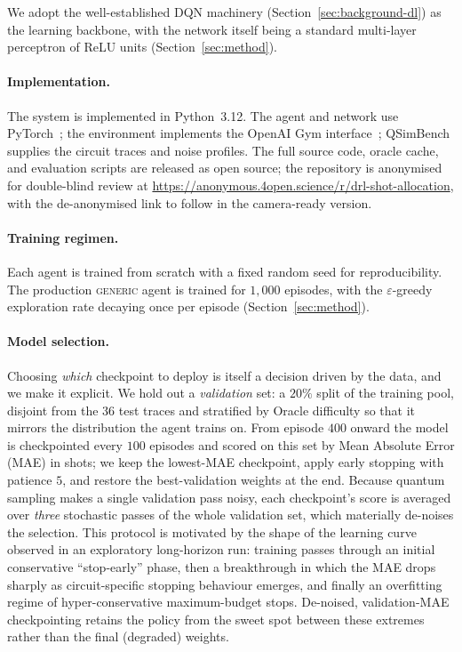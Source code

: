 \documentclass[runningheads]{llncs}
\begin{document}
We adopt the well-established DQN machinery (Section~\ref{sec:background-dl}) as
the learning backbone, with the network itself being a standard multi-layer
perceptron of ReLU units (Section~\ref{sec:method}).

\paragraph{Implementation.} The system is implemented in Python~3.12. The agent
and network use PyTorch~\cite{paszke2019pytorch}; the environment implements the
OpenAI Gym interface~\cite{brockman2016gym}; QSimBench supplies the circuit
traces and noise profiles. The full source code, oracle cache, and evaluation
scripts are released as open source; the repository is anonymised for
double-blind review at
\url{https://anonymous.4open.science/r/drl-shot-allocation}, with the
de-anonymised link to follow in the camera-ready version.

\paragraph{Training regimen.} Each agent is trained from scratch with a fixed
random seed for reproducibility. The production \textsc{generic} agent is
trained for $1{,}000$ episodes, with the $\varepsilon$-greedy exploration rate
decaying once per episode (Section~\ref{sec:method}).

\paragraph{Model selection.} Choosing \emph{which} checkpoint to deploy is itself
a decision driven by the data, and we make it explicit. We hold out a
\emph{validation} set: a $20\%$ split of the training pool, disjoint from the 36
test traces and stratified by Oracle difficulty so that it mirrors the
distribution the agent trains on. From episode $400$ onward the model is
checkpointed every $100$ episodes and scored on this set by Mean Absolute Error
(MAE) in shots; we keep the lowest-MAE checkpoint, apply early stopping with
patience $5$, and restore the best-validation weights at the end. Because quantum
sampling makes a single validation pass noisy, each checkpoint's score is
averaged over \emph{three} stochastic passes of the whole validation set, which
materially de-noises the selection. This protocol is motivated by the shape of
the learning curve observed in an exploratory long-horizon run: training passes
through an initial conservative ``stop-early'' phase, then a breakthrough in
which the MAE drops sharply as circuit-specific stopping behaviour emerges, and
finally an overfitting regime of hyper-conservative maximum-budget stops.
De-noised, validation-MAE checkpointing retains the policy from the sweet spot
between these extremes rather than the final (degraded) weights.
\end{document}
